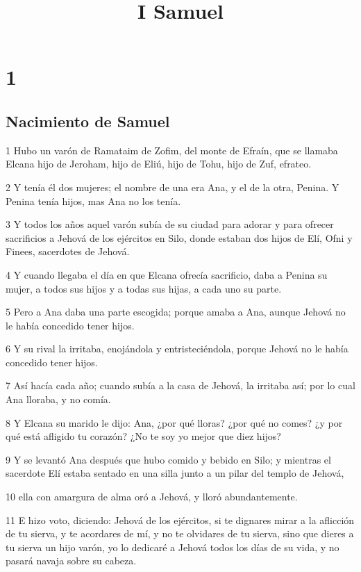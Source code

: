 

\title{I Samuel}

\chapter{1}

\section*{Nacimiento de Samuel}

\par 1 Hubo un varón de Ramataim de Zofim, del monte de Efraín, que se llamaba Elcana hijo de Jeroham, hijo de Eliú, hijo de Tohu, hijo de Zuf, efrateo.
\par 2 Y tenía él dos mujeres; el nombre de una era Ana, y el de la otra, Penina. Y Penina tenía hijos, mas Ana no los tenía.
\par 3 Y todos los años aquel varón subía de su ciudad para adorar y para ofrecer sacrificios a Jehová de los ejércitos en Silo, donde estaban dos hijos de Elí, Ofni y Finees, sacerdotes de Jehová.
\par 4 Y cuando llegaba el día en que Elcana ofrecía sacrificio, daba a Penina su mujer, a todos sus hijos y a todas sus hijas, a cada uno su parte.
\par 5 Pero a Ana daba una parte escogida; porque amaba a Ana, aunque Jehová no le había concedido tener hijos.
\par 6 Y su rival la irritaba, enojándola y entristeciéndola, porque Jehová no le había concedido tener hijos.
\par 7 Así hacía cada año; cuando subía a la casa de Jehová, la irritaba así; por lo cual Ana lloraba, y no comía.
\par 8 Y Elcana su marido le dijo: Ana, ¿por qué lloras? ¿por qué no comes? ¿y por qué está afligido tu corazón? ¿No te soy yo mejor que diez hijos?
\par 9 Y se levantó Ana después que hubo comido y bebido en Silo; y mientras el sacerdote Elí estaba sentado en una silla junto a un pilar del templo de Jehová,
\par 10 ella con amargura de alma oró a Jehová, y lloró abundantemente.
\par 11 E hizo voto, diciendo: Jehová de los ejércitos, si te dignares mirar a la aflicción de tu sierva, y te acordares de mí, y no te olvidares de tu sierva, sino que dieres a tu sierva un hijo varón, yo lo dedicaré a Jehová todos los días de su vida, y no pasará navaja sobre su cabeza. 
